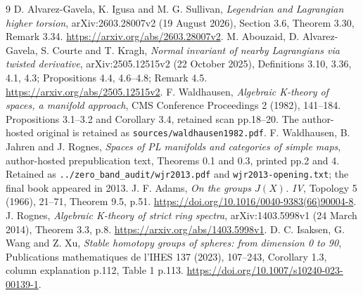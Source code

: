 \documentclass[11pt]{article}
\theoremstyle{remark}
\begin{document}
\begin{thebibliography}{9}
D. Alvarez-Gavela, K. Igusa and M. G. Sullivan,
\emph{Legendrian and Lagrangian higher torsion},
arXiv:2603.28007v2 (19 August 2026), Section 3.6, Theorem 3.30,
Remark 3.34.
\url{https://arxiv.org/abs/2603.28007v2}.
M. Abouzaid, D. Alvarez-Gavela, S. Courte and T. Kragh,
\emph{Normal invariant of nearby Lagrangians via twisted derivative},
arXiv:2505.12515v2 (22 October 2025), Definitions 3.10, 3.36,
4.1, 4.3; Propositions 4.4, 4.6--4.8; Remark 4.5.
\url{https://arxiv.org/abs/2505.12515v2}.
F. Waldhausen, \emph{Algebraic K-theory of spaces, a manifold approach},
CMS Conference Proceedings 2 (1982), 141--184.
Propositions 3.1--3.2 and Corollary 3.4, retained scan pp.18--20.
The author-hosted original is retained as
\texttt{sources/waldhausen1982.pdf}.
F. Waldhausen, B. Jahren and J. Rognes,
\emph{Spaces of PL manifolds and categories of simple maps},
author-hosted prepublication text, Theorems 0.1 and 0.3,
printed pp.2 and 4. Retained as
\texttt{../zero\_band\_audit/wjr2013.pdf} and
\texttt{wjr2013-opening.txt}; the final book appeared in 2013.
J. F. Adams, \emph{On the groups \(J(X)\). IV},
Topology 5 (1966), 21--71, Theorem 9.5, p.51.
\url{https://doi.org/10.1016/0040-9383(66)90004-8}.
J. Rognes, \emph{Algebraic K-theory of strict ring spectra},
arXiv:1403.5998v1 (24 March 2014), Theorem 3.3, p.8.
\url{https://arxiv.org/abs/1403.5998v1}.
D. C. Isaksen, G. Wang and Z. Xu,
\emph{Stable homotopy groups of spheres: from dimension 0 to 90},
Publications mathematiques de l'IHES 137 (2023), 107--243,
Corollary 1.3, column explanation p.112, Table 1 p.113.
\url{https://doi.org/10.1007/s10240-023-00139-1}.
\end{thebibliography}
\end{document}
